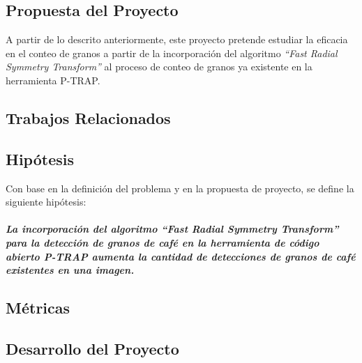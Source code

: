 \subsection{Propuesta del Proyecto}
A partir de lo descrito anteriormente, este proyecto pretende estudiar la eficacia en el conteo de granos a partir de la incorporaci\'on del algoritmo \textit{“Fast Radial Symmetry Transform”} al proceso de conteo de granos ya existente en la herramienta P-TRAP.
\subsection{Trabajos Relacionados}
\subsection{Hip\'otesis}
Con base en la definici\'on del problema y en la propuesta de proyecto, se define la siguiente hip\'otesis:\\\\
\textbf{\textit{La incorporaci\'on del algoritmo “Fast Radial Symmetry Transform” para la detecci\'on de granos de caf\'e en la herramienta de c\'odigo abierto P-TRAP aumenta la cantidad de detecciones de granos de caf\'e existentes en una imagen.}} 
\subsection{M\'etricas}
\subsection{Desarrollo del Proyecto}
